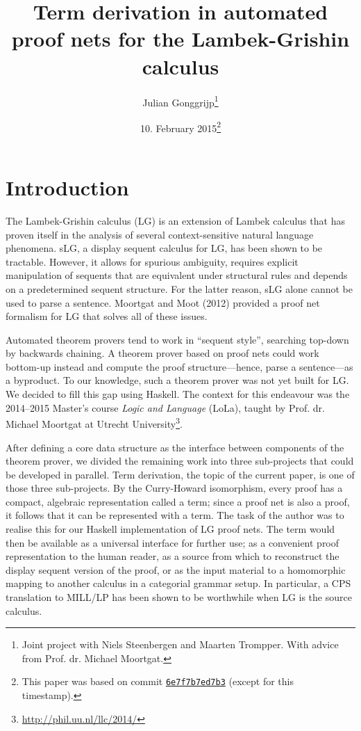 \documentclass[12pt,a4paper]{article}
\begin{document}
\title{Term derivation in automated proof nets for the Lambek-Grishin calculus}
\author{Julian Gonggrijp\thanks{Joint project with Niels Steenbergen and Maarten Trompper. With advice from Prof. dr. Michael Moortgat.}}
\date{10. February 2015\thanks{This paper was based on commit \href{https://github.com/jgonggrijp/net-prove/tree/6e7f7b7ed7b3b78737331cadea354efbba89216b}{\texttt{6e7f7b7ed7b3}} (except for this timestamp).}}
\maketitle


\section{Introduction}

The Lambek-Grishin calculus (LG) is an extension of Lambek calculus that has proven itself in the analysis of several context-sensitive natural language phenomena. sLG, a display sequent calculus for LG, has been shown to be tractable. \cite{m09} However, it allows for spurious ambiguity, requires explicit manipulation of sequents that are equivalent under structural rules and depends on a predetermined sequent structure. For the latter reason, sLG alone cannot be used to parse a sentence. Moortgat and Moot (2012) provided a proof net formalism for LG that solves all of these issues. \cite{mm12}

Automated theorem provers tend to work in ``sequent style'', searching top-down by backwards chaining. A theorem prover based on proof nets could work bottom-up instead and compute the proof structure---hence, parse a sentence---as a byproduct. To our knowledge, such a theorem prover was not yet built for LG. We decided to fill this gap using Haskell. The context for this endeavour was the 2014--2015 Master's course \emph{Logic and Language} (LoLa), taught by Prof. dr. Michael Moortgat at Utrecht University\footnote{\url{http://phil.uu.nl/llc/2014/}}.

After defining a core data structure as the interface between components of the theorem prover, we divided the remaining work into three sub-projects that could be developed in parallel. Term derivation, the topic of the current paper, is one of those three sub-projects. By the Curry-Howard isomorphism, every proof has a compact, algebraic representation called a term; since a proof net is also a proof, it follows that it can be represented with a term. The task of the author was to realise this for our Haskell implementation of LG proof nets. The term would then be available as a universal interface for further use; as a convenient proof representation to the human reader, as a source from which to reconstruct the display sequent version of the proof, or as the input material to a homomorphic mapping to another calculus in a categorial grammar setup. In particular, a CPS translation to MILL/LP has been shown to be worthwhile when LG is the source calculus. \cite{mm12}
\end{document}
